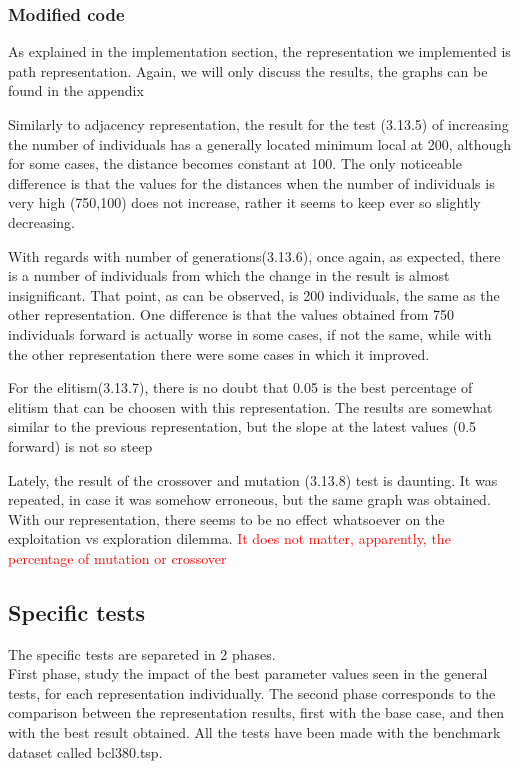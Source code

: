 \subsubsection{Modified code}

As explained in the implementation section, the representation we
implemented is path representation. Again, we will only discuss the
results, the graphs can be found in the appendix

Similarly to adjacency representation, the result for the test (3.13.5)
of increasing the number of individuals has a generally located minimum local at
200, although for some cases, the distance becomes constant at 100. The only
noticeable difference is that the values for the distances when the number of
individuals is very high (750,100) does not increase, rather it seems to keep
ever so slightly decreasing.

With regards with number of generations(3.13.6), once again, as expected, there is a number of individuals from which the
change in the result is almost insignificant. That point, as can be observed, is 200
individuals, the same as the other representation. One difference is that the
values obtained from 750 individuals forward is actually worse in some
cases, if not the same, while with the other representation there were some
cases in which it improved.

For the elitism(3.13.7), there is no doubt that 0.05 is the best
percentage of elitism that can be choosen with this representation. The results
are somewhat similar to the previous representation, but the slope at the
latest values (0.5 forward) is not so steep

Lately, the result of the crossover and mutation (3.13.8)  test is daunting. It was repeated, in case it was somehow
erroneous, but the same graph was obtained. With our representation, there
seems to be no effect whatsoever on the exploitation vs exploration dilemma.
\textcolor{red}{It does not matter, apparently, the percentage of mutation
or crossover}
\\

\subsection{Specific tests}

The specific tests are separeted in 2 phases.\\
 First phase, study the impact of the best parameter values seen in the general
tests, for each representation individually. The second phase
corresponds to the comparison between the representation results, first with the
base case, and then with the best result obtained.
All the tests have been made with the benchmark dataset called bcl380.tsp.

